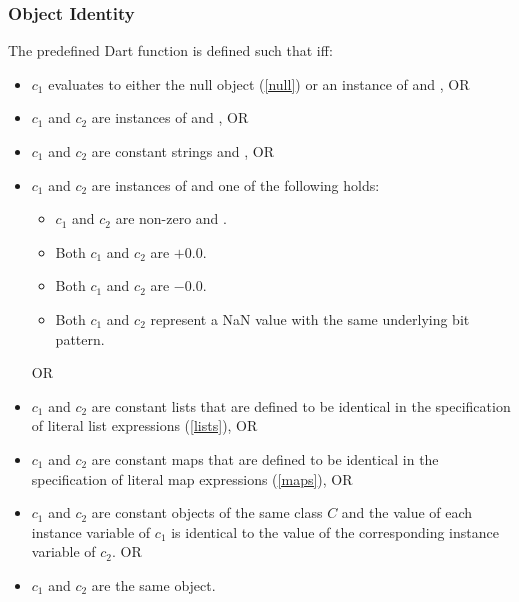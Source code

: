 \documentclass{article}
\begin{document}


\subsubsection{Object Identity}

\LMHash{}
The predefined Dart function  is defined such that  if{}f:
\begin{itemize}
\item $c_1$ evaluates to either the null object (\ref{null}) or an instance of  and , OR
\item $c_1$ and $c_2$ are instances of  and , OR
\item $c_1$ and $c_2$ are constant strings and , OR
\item $c_1$ and $c_2$ are instances of  and one of the following holds:
  \begin{itemize}
  \item $c_1$ and $c_2$ are non-zero and .
  \item Both $c_1$ and $c_2$ are $+0.0$.
  \item Both $c_1$ and $c_2$ are $-0.0$.
  \item Both $c_1$ and $c_2$ represent a NaN value with the same underlying bit pattern.
  \end{itemize}
 OR
\item $c_1$ and $c_2$ are constant lists that are defined to be identical in the specification of literal list expressions (\ref{lists}), OR
\item $c_1$ and $c_2$ are constant maps that are defined to be identical in the specification of literal map expressions (\ref{maps}), OR
\item $c_1$ and $c_2$ are constant objects of the same class $C$ and the value of each instance variable of $c_1$ is identical to the value of the corresponding instance variable of $c_2$. OR
\item $c_1$ and $c_2$ are the same object.
\end{itemize}
\end{document}
